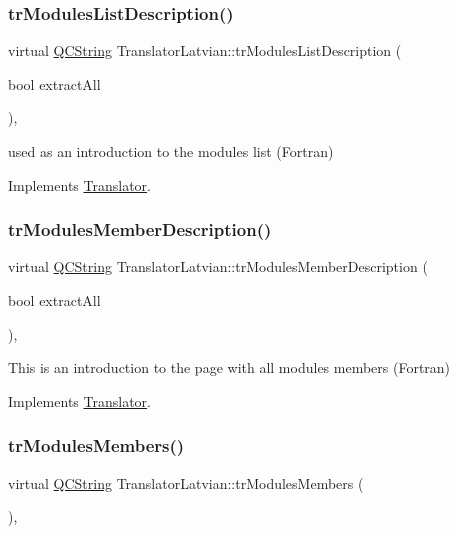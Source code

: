\subsubsection{\texorpdfstring{trModulesListDescription()}{trModulesListDescription()}}
{\footnotesize\ttfamily virtual \mbox{\hyperlink{class_q_c_string}{Q\+C\+String}} Translator\+Latvian\+::tr\+Modules\+List\+Description (\begin{DoxyParamCaption}\item[{bool}]{extract\+All }\end{DoxyParamCaption})\hspace{0.3cm}{\ttfamily [inline]}, {\ttfamily [virtual]}}

used as an introduction to the modules list (Fortran) 

Implements \mbox{\hyperlink{class_translator}{Translator}}.

\mbox{\label{class_translator_latvian_afac86ad3334aca121bfed96fcd0c5c61}} 
\subsubsection{\texorpdfstring{trModulesMemberDescription()}{trModulesMemberDescription()}}
{\footnotesize\ttfamily virtual \mbox{\hyperlink{class_q_c_string}{Q\+C\+String}} Translator\+Latvian\+::tr\+Modules\+Member\+Description (\begin{DoxyParamCaption}\item[{bool}]{extract\+All }\end{DoxyParamCaption})\hspace{0.3cm}{\ttfamily [inline]}, {\ttfamily [virtual]}}

This is an introduction to the page with all modules members (Fortran) 

Implements \mbox{\hyperlink{class_translator}{Translator}}.

\mbox{\label{class_translator_latvian_af5c08881335d62614972f8a2853c4cbe}} 
\subsubsection{\texorpdfstring{trModulesMembers()}{trModulesMembers()}}
{\footnotesize\ttfamily virtual \mbox{\hyperlink{class_q_c_string}{Q\+C\+String}} Translator\+Latvian\+::tr\+Modules\+Members (\begin{DoxyParamCaption}{ }\end{DoxyParamCaption})\hspace{0.3cm}{\ttfamily [inline]}, {\ttfamily [virtual]}}


